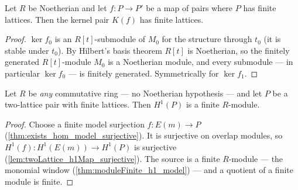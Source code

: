 \begin{lemma}
  \label{lem:moduleFinite_aeval_kernelPair}
  \leanok
  Let \(R\) be Noetherian and let \(f : P \to P'\) be a map of pairs where \(P\) has
  finite lattices. Then the kernel pair \(K(f)\) has finite lattices.
\end{lemma}
\begin{proof}
  \leanok
  \(\ker f_0\) is an \(R[t]\)-submodule of \(M_0\) for the structure through \(t_0\)
  (it is stable under \(t_0\)). By Hilbert's basis theorem \(R[t]\) is Noetherian, so
  the finitely generated \(R[t]\)-module \(M_0\) is a Noetherian module, and every
  submodule --- in particular \(\ker f_0\) --- is finitely generated. Symmetrically
  for \(\ker f_1\).
\end{proof}

\begin{theorem}
  \label{thm:twoLattice_coh1}
  \leanok
  Let \(R\) be \emph{any} commutative ring --- no Noetherian hypothesis --- and let
  \(P\) be a two-lattice pair with finite lattices. Then \(H^1(P)\) is a finite
  \(R\)-module.
\end{theorem}
\begin{proof}
  \leanok
  Choose a finite model surjection \(f : E(m) \to P\)
  (\ref{thm:exists_hom_model_surjective}). It is surjective on overlap modules, so
  \(H^1(f) : H^1(E(m)) \to H^1(P)\) is surjective
  (\ref{lem:twoLattice_h1Map_surjective}). The source is a finite \(R\)-module --- the
  monomial window (\ref{thm:moduleFinite_h1_model}) --- and a quotient of a finite
  module is finite.
\end{proof}

